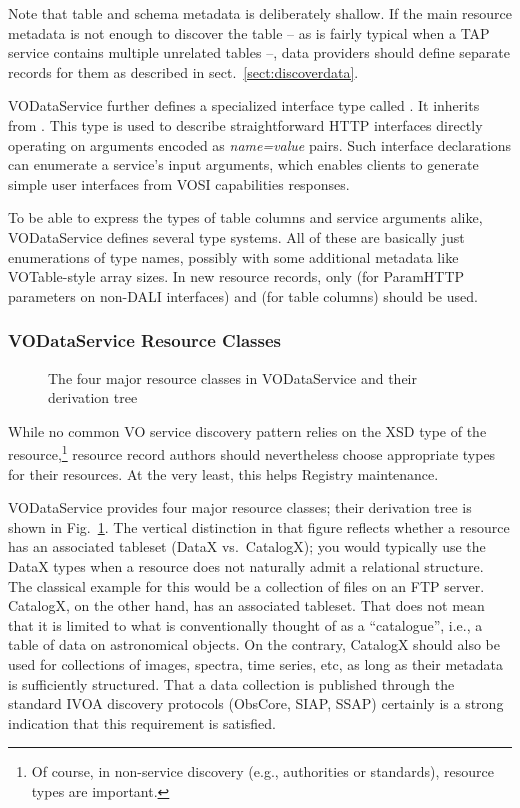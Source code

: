 \documentclass[11pt,a4paper]{ivoa}
\begin{document}
Note that table and schema metadata is deliberately shallow.  If the
main resource metadata is not enough to discover the table -- as is
fairly typical when a TAP service contains multiple unrelated tables --,
data providers should define separate records for them as described in
sect.~\ref{sect:discoverdata}.

VODataService further defines a specialized interface type called
.  It inherits from .
This type is used to describe
straightforward HTTP interfaces directly operating on
arguments encoded as
\emph{name=value} pairs.  Such interface declarations can
enumerate a service's input arguments, which enables clients
to generate simple
user interfaces from VOSI capabilities responses.

To be able to express the types of table columns and service arguments
alike, VODataService defines several type systems.  All of these are
basically just enumerations of type names, possibly with some additional
metadata like VOTable-style array sizes.  In new resource records, only
 (for ParamHTTP parameters on non-DALI
interfaces) and
 (for table columns) should be used.

\subsubsection{VODataService Resource Classes}
\label{sect:rescls}

\begin{figure}
\centerline{}
\caption{The four major resource classes in VODataService and their
derivation tree}
\label{fig:rescls}
\end{figure}

While no common VO service discovery pattern relies on the XSD type  of the
resource,\footnote{Of course, in non-service discovery (e.g., authorities
or standards), resource types are important.} resource
record authors should
nevertheless choose appropriate types for their resources.  At the
very least, this helps Registry maintenance.

VODataService provides four major resource classes; their derivation
tree is shown in Fig.~\ref{fig:rescls}.  The vertical distinction in
that figure reflects whether a resource has an associated tableset
(DataX vs.~CatalogX); you would typically use the DataX types when a
resource does not naturally admit a relational structure.  The classical
example for this would be a collection of files on an FTP server.  CatalogX,
on the other hand, has an associated tableset.  That does not mean that
it is limited to what is conventionally thought of as a ``catalogue'',
i.e., a table of data on astronomical objects.  On the
contrary, CatalogX should also be used for collections of images,
spectra, time series, etc, as long as their metadata is sufficiently
structured.  That a data collection is published through the standard
IVOA discovery protocols (ObsCore,
SIAP, SSAP) certainly is a strong indication that this requirement is
satisfied.
\end{document}
